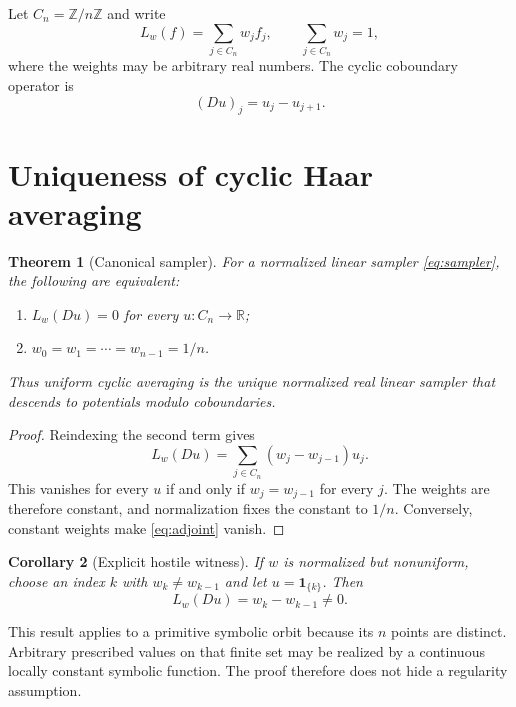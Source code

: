 \documentclass[11pt]{article}
\newtheorem{theorem}{Theorem}[section]
\newtheorem{corollary}[theorem]{Corollary}
\newcommand{\one}{\mathbf 1}
\begin{document}
Let $C_n=\mathbb Z/n\mathbb Z$ and write
\begin{equation}\label{eq:sampler}
 L_w(f)=\sum_{j\in C_n}w_jf_j,
 \qquad \sum_{j\in C_n}w_j=1,
\end{equation}
where the weights may be arbitrary real numbers.  The cyclic coboundary
operator is
\begin{equation}\label{eq:D}
 (Du)_j=u_j-u_{j+1}.
\end{equation}

\section{Uniqueness of cyclic Haar averaging}

\begin{theorem}[Canonical sampler]\label{thm:unique}
For a normalized linear sampler \eqref{eq:sampler}, the following are
equivalent:
\begin{enumerate}
 \item $L_w(Du)=0$ for every $u:C_n\to\mathbb R$;
 \item $w_0=w_1=\cdots=w_{n-1}=1/n$.
\end{enumerate}
Thus uniform cyclic averaging is the unique normalized real linear sampler
that descends to potentials modulo coboundaries.
\end{theorem}

\begin{proof}
Reindexing the second term gives
\begin{equation}\label{eq:adjoint}
 L_w(Du)=\sum_{j\in C_n}(w_j-w_{j-1})u_j.
\end{equation}
This vanishes for every $u$ if and only if $w_j=w_{j-1}$ for every $j$.
The weights are therefore constant, and normalization fixes the constant to
$1/n$.  Conversely, constant weights make \eqref{eq:adjoint} vanish.
\end{proof}

\begin{corollary}[Explicit hostile witness]\label{cor:witness}
If $w$ is normalized but nonuniform, choose an index $k$ with
$w_k\ne w_{k-1}$ and let $u=\one_{\{k\}}$.  Then
\begin{equation}\label{eq:witness}
 L_w(Du)=w_k-w_{k-1}\ne0.
\end{equation}
\end{corollary}

This result applies to a primitive symbolic orbit because its $n$ points are
distinct.  Arbitrary prescribed values on that finite set may be realized
by a continuous locally constant symbolic function.  The proof therefore
does not hide a regularity assumption.
\end{document}
